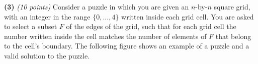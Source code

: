 \documentclass[11pt]{article}
\begin{document}
\setlength{\parindent}{0in}
\addtolength{\parskip}{0.1cm}
\setlength{\fboxrule}{.5mm}\setlength{\fboxsep}{1.2mm}
\newlength{\boxlength}\setlength{\boxlength}{\textwidth}
\addtolength{\boxlength}{-4mm}
\begin{center}
\end{center}
\vspace{5mm}

{ \bf (3)} {\em (10 points)}
Consider a puzzle in which you are given an $n$-by-$n$
square grid, with an integer in the range $\{0,\ldots,4\}$
written inside each grid cell. You are asked to select a
subset $F$ of the edges of the grid, such that for each 
grid cell the number written inside the cell matches 
the number of elements of $F$ that belong to
the cell's boundary. The following figure shows an 
example of a puzzle and a valid solution to the puzzle.
\end{document}
